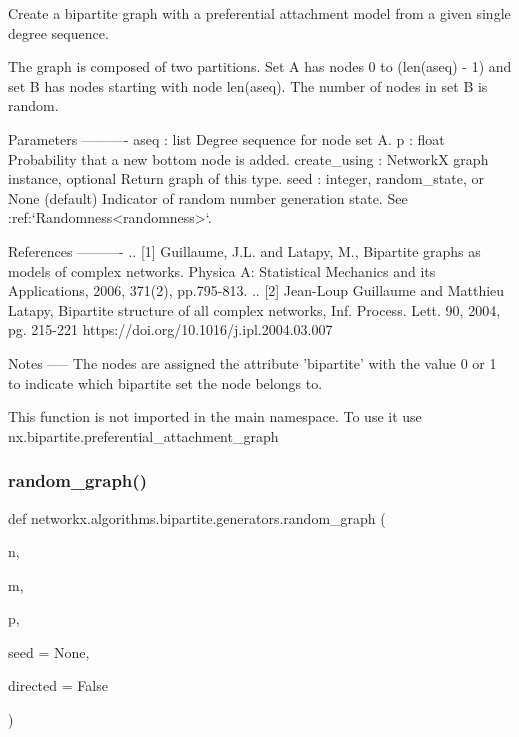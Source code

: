 \begin{DoxyVerb}Create a bipartite graph with a preferential attachment model from
a given single degree sequence.

The graph is composed of two partitions. Set A has nodes 0 to
(len(aseq) - 1) and set B has nodes starting with node len(aseq).
The number of nodes in set B is random.

Parameters
----------
aseq : list
   Degree sequence for node set A.
p :  float
   Probability that a new bottom node is added.
create_using : NetworkX graph instance, optional
   Return graph of this type.
seed : integer, random_state, or None (default)
    Indicator of random number generation state.
    See :ref:`Randomness<randomness>`.

References
----------
.. [1] Guillaume, J.L. and Latapy, M.,
   Bipartite graphs as models of complex networks.
   Physica A: Statistical Mechanics and its Applications,
   2006, 371(2), pp.795-813.
.. [2] Jean-Loup Guillaume and Matthieu Latapy,
   Bipartite structure of all complex networks,
   Inf. Process. Lett. 90, 2004, pg. 215-221
   https://doi.org/10.1016/j.ipl.2004.03.007

Notes
-----
The nodes are assigned the attribute 'bipartite' with the value 0 or 1
to indicate which bipartite set the node belongs to.

This function is not imported in the main namespace.
To use it use nx.bipartite.preferential_attachment_graph
\end{DoxyVerb}
 \mbox{\label{namespacenetworkx_1_1algorithms_1_1bipartite_1_1generators_ac72f63542228b0d51d526526ee600760}} 
\subsubsection{\texorpdfstring{random\+\_\+graph()}{random\_graph()}}
{\footnotesize\ttfamily def networkx.\+algorithms.\+bipartite.\+generators.\+random\+\_\+graph (\begin{DoxyParamCaption}\item[{}]{n,  }\item[{}]{m,  }\item[{}]{p,  }\item[{}]{seed = {\ttfamily None},  }\item[{}]{directed = {\ttfamily False} }\end{DoxyParamCaption})}

